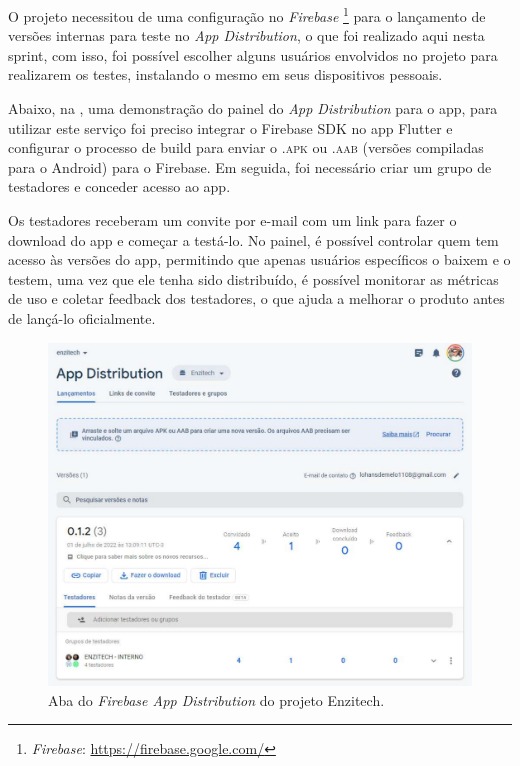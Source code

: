  O projeto necessitou de uma configuração no \textit{Firebase} \footnote{\label{firebase}\textit{Firebase}: \url{https://firebase.google.com/}} para o lançamento de versões internas para teste no \textit{App Distribution}, o que foi realizado aqui nesta sprint, com isso, foi possível escolher alguns usuários envolvidos no projeto para realizarem os testes, instalando o mesmo em seus dispositivos pessoais. 

 Abaixo, na , uma demonstração do painel do \textit{App Distribution} para o \ac{app}, para utilizar este serviço foi preciso integrar o Firebase SDK no \ac{app} Flutter e configurar o processo de build para enviar o \textsc{.apk} ou \textsc{.aab} (versões compiladas para o Android) para o Firebase. Em seguida, foi necessário criar um grupo de testadores e conceder acesso ao \ac{app}.

Os testadores receberam um convite por e-mail com um link para fazer o download do \ac{app} e começar a testá-lo. No painel, é possível controlar quem tem acesso às versões do \ac{app}, permitindo que apenas usuários específicos o baixem e o testem, uma vez que ele tenha sido distribuído, é possível monitorar as métricas de uso e coletar feedback dos testadores, o que ajuda a melhorar o produto antes de lançá-lo oficialmente.

\begin{figure}[H]
\centering
  \includegraphics[width=\columnwidth]{images/app_distribution.pdf}
  \caption{Aba do \textit{Firebase App Distribution} do projeto Enzitech.}
  \label{fig:app_distribution}
\end{figure}
 
